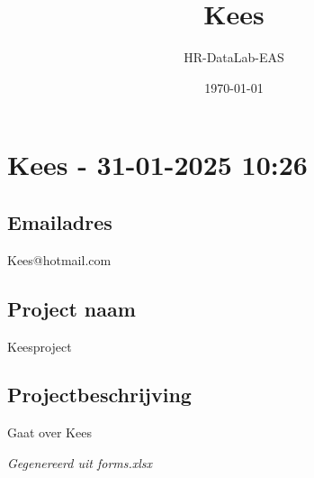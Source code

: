 \documentclass[a4paper,11pt]{article}
\title{Kees}
\author{HR-DataLab-EAS}
\date{\today}
\begin{document}
\maketitle

\section*{Kees - 31-01-2025 10:26}
\hrulefill


\subsection*{Emailadres}
Kees@hotmail.com


\subsection*{Project naam}
Keesproject


\subsection*{Projectbeschrijving}
Gaat over Kees


\hrulefill

\textit{Gegenereerd uit forms.xlsx}
\end{document}
